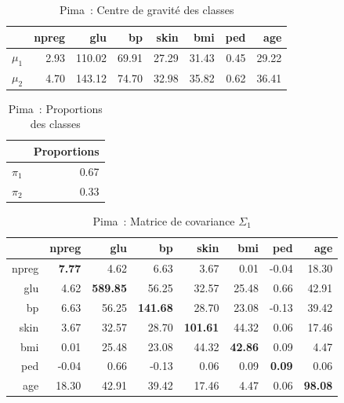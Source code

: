 \documentclass[a4paper,10pt]{report}
\begin{document}
\begin{table}[H]
	\centering
	\begin{tabular}{r|rrrrrrr}
		& npreg & glu & bp & skin & bmi & ped & age \\ 
		\hline
		$\mu_{1}$  & 2.93 & 110.02 & 69.91 & 27.29 & 31.43 & 0.45 & 29.22 \\ 
		$\mu_{2}$  & 4.70 & 143.12 & 74.70 & 32.98 & 35.82 & 0.62 & 36.41 \\ 
	\end{tabular}
	\caption{Pima~: Centre de gravité des classes}
\end{table}

\begin{table}[H]
	\centering
	\begin{tabular}{rr}
		\hline
		& Proportions \\ 
		\hline
		$\pi_{1}$ & 0.67 \\ 
		$\pi_{2}$ & 0.33 \\ 
	\end{tabular}
	\caption{Pima~: Proportions des classes}
\end{table}

\begin{table}[H]
	\centering
	\begin{tabular}{r|rrrrrrr}
		& npreg & glu & bp & skin & bmi & ped & age \\ 
		\hline
		npreg & \textbf{7.77} & 4.62 & 6.63 & 3.67 & 0.01 & -0.04 & 18.30 \\ 
		glu & 4.62 & \textbf{589.85} & 56.25 & 32.57 & 25.48 & 0.66 & 42.91 \\ 
		bp & 6.63 & 56.25 & \textbf{141.68} & 28.70 & 23.08 & -0.13 & 39.42 \\ 
		skin & 3.67 & 32.57 & 28.70 & \textbf{101.61} & 44.32 & 0.06 & 17.46 \\ 
		bmi & 0.01 & 25.48 & 23.08 & 44.32 & \textbf{42.86} & 0.09 & 4.47 \\ 
		ped & -0.04 & 0.66 & -0.13 & 0.06 & 0.09 & \textbf{0.09} & 0.06 \\ 
		age & 18.30 & 42.91 & 39.42 & 17.46 & 4.47 & 0.06 & \textbf{98.08} \\ 
	\end{tabular}
	\caption{Pima~: Matrice de covariance $\Sigma_{1}$}
\end{table}
\end{document}
